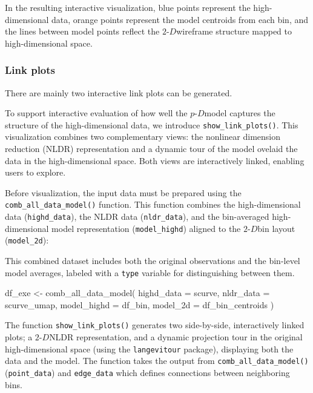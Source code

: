 \documentclass[
  11pt,
  a4paper,
]{report}
\newenvironment{Shaded}{\begin{snugshade}}{\end{snugshade}}
\newcommand{\AttributeTok}[1]{\textcolor[rgb]{0.40,0.45,0.13}{#1}}
\newcommand{\FunctionTok}[1]{\textcolor[rgb]{0.28,0.35,0.67}{#1}}
\newcommand{\NormalTok}[1]{\textcolor[rgb]{0.00,0.23,0.31}{#1}}
\newcommand{\OtherTok}[1]{\textcolor[rgb]{0.00,0.23,0.31}{#1}}
\newcommand\pD{$p\text{-}D$}
\newcommand{\twoD}{$2\text{-}D$}
\begin{document}
In the resulting interactive visualization, blue points represent the
high-dimensional data, orange points represent the model centroids from
each bin, and the lines between model points reflect the \twoD wireframe
structure mapped to high-dimensional space.

\subsubsection{Link plots}\label{link-plots}

There are mainly two interactive link plots can be generated.

To support interactive evaluation of how well the \pD model captures the
structure of the high-dimensional data, we introduce
\texttt{show\_link\_plots()}. This visualization combines two
complementary views: the nonlinear dimension reduction (NLDR)
representation and a dynamic tour of the model ovelaid the data in the
high-dimensional space. Both views are interactively linked, enabling
users to explore.

Before visualization, the input data must be prepared using the
\texttt{comb\_all\_data\_model()} function. This function combines the
high-dimensional data (\texttt{highd\_data}), the NLDR data
(\texttt{nldr\_data}), and the bin-averaged high-dimensional model
representation (\texttt{model\_highd}) aligned to the \twoD bin layout
(\texttt{model\_2d}):

This combined dataset includes both the original observations and the
bin-level model averages, labeled with a \texttt{type} variable for
distinguishing between them.

\begin{Shaded}
\begin{Highlighting}[]
\NormalTok{df\_exe }\OtherTok{\textless{}{-}} \FunctionTok{comb\_all\_data\_model}\NormalTok{(}
  \AttributeTok{highd\_data =}\NormalTok{ scurve, }
  \AttributeTok{nldr\_data =}\NormalTok{ scurve\_umap, }
  \AttributeTok{model\_highd =}\NormalTok{ df\_bin, }
  \AttributeTok{model\_2d =}\NormalTok{ df\_bin\_centroids}
\NormalTok{  )}
\end{Highlighting}
\end{Shaded}

The function \texttt{show\_link\_plots()} generates two side-by-side,
interactively linked plots; a \twoD NLDR representation, and a dynamic
projection tour in the original high-dimensional space (using the
\texttt{langevitour} package), displaying both the data and the model.
The function takes the output from \texttt{comb\_all\_data\_model()}
(\texttt{point\_data}) and \texttt{edge\_data} which defines connections
between neighboring bins.
\end{document}
